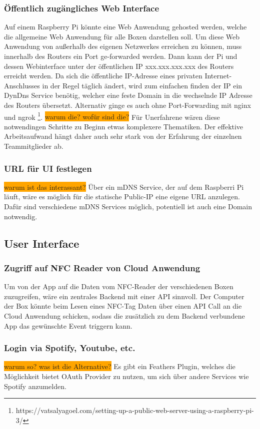 \documentclass[10pt, a4paper]{article}
\begin{document}
\subsubsection{Öffentlich zugängliches Web Interface}
Auf einem Raspberry Pi könnte eine Web Anwendung gehosted werden, welche die allgemeine Web Anwendung für alle Boxen darstellen soll.
Um diese Web Anwendung von außerhalb des eigenen Netzwerkes erreichen zu können, muss innerhalb des Routers ein Port ge-forwarded werden.
Dann kann der Pi und dessen Webinterface unter der öffentlichen IP xxx.xxx.xxx.xxx des Routers erreicht werden.
Da sich die öffentliche IP-Adresse eines privaten Internet-Anschlusses in der Regel täglich ändert, wird zum einfachen finden der IP ein DynDns Service benötig, welcher eine feste Domain in die wechselnde IP Adresse des Routers übersetzt.
Alternativ ginge es auch ohne Port-Forwarding mit nginx und ngrok \footnote{https://vatsalyagoel.com/setting-up-a-public-web-server-using-a-raspberry-pi-3/}.
\colorbox{orange}{warum die? wofür sind die?}
Für Unerfahrene wären diese notwendingen Schritte zu Beginn etwas komplexere Thematiken. Der effektive Arbeitsaufwand hängt daher auch sehr stark von der Erfahrung der einzelnen Teammitglieder ab.

\subsubsection{URL für UI festlegen}
\colorbox{orange}{warum ist das interassant?}
Über ein mDNS Service, der auf dem Raspberri Pi läuft, wäre es möglich für die statische Public-IP eine eigene URL anzulegen.
Dafür sind verschiedene mDNS Services möglich, potentiell ist auch eine Domain notwendig.

\subsection{User Interface}
\subsubsection{Zugriff auf NFC Reader von Cloud Anwendung}
Um von der App auf die Daten vom NFC-Reader der verschiedenen Boxen zuzugreifen, wäre ein zentrales Backend mit einer API sinnvoll.
Der Computer der Box könnte beim Lesen eines NFC-Tag Daten über einen API Call an die Cloud Anwendung schicken, sodass die zusätzlich zu dem Backend verbundene App das gewünschte Event triggern kann.

\subsubsection{Login via Spotify, Youtube, etc.}
\colorbox{orange}{warum so? was ist die Alternative?}
Es gibt ein Feathers Plugin, welches die Möglichkeit bietet OAuth Provider zu nutzen, um sich über andere Services wie Spotify anzumelden.
\end{document}
